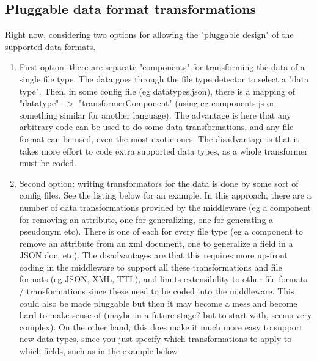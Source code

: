 \subsection{Pluggable data format transformations}
Right now, considering two options for allowing the "pluggable design" of the supported data formats. 
\begin{enumerate}[label=(\alph*)]
\item First option: there are separate "components" for transforming the data of a single file type. The data goes through the file type detector to select a "data type". Then, in some config file (eg datatypes.json), there is a mapping of "datatype" -$>$ "transformerComponent" (using eg components.js or something similar for another language). The advantage is here that any arbitrary code can be used to do some data transformations, and any file format can be used, even the most exotic ones. The disadvantage is that it takes more effort to code extra supported data types, as a whole transformer must be coded.
\item Second option: writing transformators for the data is done by some sort of config files. See the listing below for an example. In this approach, there are a number of data transformations provided by the middleware (eg a component for removing an attribute, one for generalizing, one for generating a pseudonym etc). There is one of each for every file type (eg a component to remove an attribute from an xml document, one to generalize a field in a JSON doc, etc). The disadvantages are that this requires more up-front coding in the middleware to support all these transformations and file formats (eg JSON, XML, TTL), and limits extensibility to other file formats / transformations since these need to be coded into the middleware. This could also be made pluggable but then it may become a mess and become hard to make sense of (maybe in a future stage? but to start with, seems very complex). On the other hand, this does make it much more easy to support new data types, since you just specify which transformations to apply to which fields, such as in the example below
\end{enumerate}

